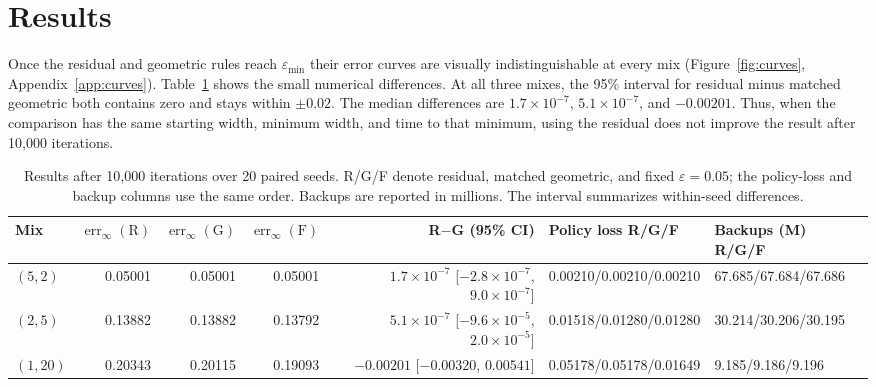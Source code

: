 \documentclass{article}
\newcommand{\err}{\operatorname{err}_{\infty}}
\begin{document}
\section{Results}

Once the residual and geometric rules reach $\varepsilon_{\min}$ their
error curves are visually indistinguishable at every mix
(Figure~\ref{fig:curves}, Appendix~\ref{app:curves}).
Table~\ref{tab:final} shows the small numerical differences.  At all three
mixes, the 95\% interval for residual minus matched geometric both contains zero
and stays within $\pm0.02$.  The median differences are $1.7\times10^{-7}$,
$5.1\times10^{-7}$, and $-0.00201$.  Thus, when the comparison has the same
starting width, minimum width, and time to that minimum, using the residual does
not improve the result after 10,000 iterations.

\begin{table}[b]
  \centering
  \scriptsize
  \setlength{\tabcolsep}{3.0pt}
  \caption{Results after 10,000 iterations over 20 paired seeds.  R/G/F denote
  residual, matched geometric, and fixed $\varepsilon=0.05$; the policy-loss
  and backup columns use the same order.  Backups are reported in millions.
  The interval summarizes within-seed differences.}
  \label{tab:final}
  \begin{tabular}{@{}lrrrrll@{}}
    \toprule
    Mix & $\err(\mathrm R)$ & $\err(\mathrm G)$ & $\err(\mathrm F)$ & R$-$G (95\% CI)
      & Policy loss R/G/F & Backups (M) R/G/F \\
    \midrule
    $(5,2)$  & 0.05001 & 0.05001 & 0.05001
      & $1.7{\times}10^{-7}$ [$-2.8{\times}10^{-7}$, $9.0{\times}10^{-7}$]
      & 0.00210/0.00210/0.00210 & 67.685/67.684/67.686 \\
    $(2,5)$  & 0.13882 & 0.13882 & 0.13792
      & $5.1{\times}10^{-7}$ [$-9.6{\times}10^{-5}$, $2.0{\times}10^{-5}$]
      & 0.01518/0.01280/0.01280 & 30.214/30.206/30.195 \\
    $(1,20)$ & 0.20343 & 0.20115 & 0.19093
      & $-0.00201$ [$-0.00320$, $0.00541$]
      & 0.05178/0.05178/0.01649 & 9.185/9.186/9.196 \\
    \bottomrule
  \end{tabular}
\end{table}
\end{document}
